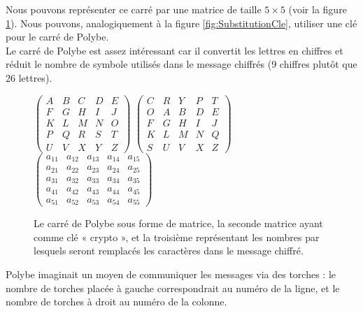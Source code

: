 Nous pouvons représenter ce carré par une matrice de taille $5\times 5$
(voir la figure \ref{fig:Polybe}). Nous pouvons, analogiquement à la
figure \ref{fig:SubstitutionCle}, utiliser une clé pour le carré de
Polybe. \\

Le carré de Polybe est assez intéressant car il convertit les lettres
en chiffres et réduit le nombre de symbole utilisés dans le message
chiffrés (9 chiffres plutôt que 26 lettres). \\

\begin{figure}[h]
  $
  \left(
    \begin{array}{ccccc}
      A & B & C & D & E \\
      F & G & H & I & J \\
      K & L & M & N & O \\
      P & Q & R & S & T \\
      U & V & X & Y & Z
    \end{array}
  \right)
  $
  \hfill
  $
  \left(
    \begin{array}{ccccc}
      C & R & Y & P & T \\
      O & A & B & D & E \\
      F & G & H & I & J \\
      K & L & M & N & Q \\
      S & U & V & X & Z
    \end{array}
  \right)
  $
  \hfill
  $
  \left(
    \begin{array}{ccccc}
      a_{11} & a_{12} & a_{13} & a_{14} & a_{15}  \\
      a_{21} & a_{22} & a_{23} & a_{24} & a_{25}  \\
      a_{31} & a_{32} & a_{33} & a_{34} & a_{35}  \\
      a_{41} & a_{42} & a_{43} & a_{44} & a_{45}  \\
      a_{51} & a_{52} & a_{53} & a_{54} & a_{55}
    \end{array}
  \right)
  $
  \caption{Le carré de Polybe sous forme de matrice, la seconde
    matrice ayant comme clé « crypto », et la troisième représentant
    les nombres par lesquels seront remplacés les caractères dans le
    message chiffré.}
  \label{fig:Polybe}
\end{figure}

Polybe imaginait un moyen de communiquer les messages via des torches
: le nombre de torches placée à gauche correspondrait au numéro de la
ligne, et le nombre de torches à droit au numéro de la colonne. \\

